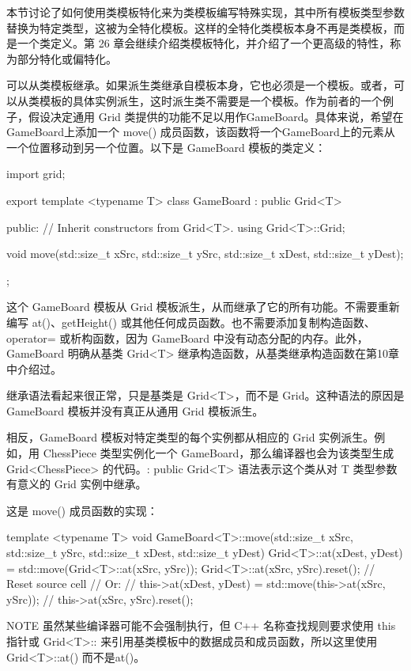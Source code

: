本节讨论了如何使用类模板特化来为类模板编写特殊实现，其中所有模板类型参数替换为特定类型，这被为全特化模板。这样的全特化类模板本身不再是类模板，而是一个类定义。第 26 章会继续介绍类模板特化，并介绍了一个更高级的特性，称为部分特化或偏特化。


可以从类模板继承。如果派生类继承自模板本身，它也必须是一个模板。或者，可以从类模板的具体实例派生，这时派生类不需要是一个模板。作为前者的一个例子，假设决定通用 Grid 类提供的功能不足以用作GameBoard。具体来说，希望在GameBoard上添加一个 move() 成员函数，该函数将一个GameBoard上的元素从一个位置移动到另一个位置。以下是 GameBoard 模板的类定义：

\begin{cpp}
import grid;

export template <typename T>
class GameBoard : public Grid<T>
{
    public:
        // Inherit constructors from Grid<T>.
        using Grid<T>::Grid;

        void move(std::size_t xSrc, std::size_t ySrc,
            std::size_t xDest, std::size_t yDest);
};
\end{cpp}

这个 GameBoard 模板从 Grid 模板派生，从而继承了它的所有功能。不需要重新编写 at()、getHeight() 或其他任何成员函数。也不需要添加复制构造函数、operator= 或析构函数，因为 GameBoard 中没有动态分配的内存。此外，GameBoard 明确从基类 Grid<T> 继承构造函数，从基类继承构造函数在第10章中介绍过。

继承语法看起来很正常，只是基类是 Grid<T>，而不是 Grid。这种语法的原因是 GameBoard 模板并没有真正从通用 Grid 模板派生。

相反，GameBoard 模板对特定类型的每个实例都从相应的 Grid 实例派生。例如，用 ChessPiece 类型实例化一个 GameBoard，那么编译器也会为该类型生成 Grid<ChessPiece> 的代码。: public Grid<T> 语法表示这个类从对 T 类型参数有意义的 Grid 实例中继承。

这是 move() 成员函数的实现：

\begin{cpp}
template <typename T>
void GameBoard<T>::move(std::size_t xSrc, std::size_t ySrc,
    std::size_t xDest, std::size_t yDest)
{
    Grid<T>::at(xDest, yDest) = std::move(Grid<T>::at(xSrc, ySrc));
    Grid<T>::at(xSrc, ySrc).reset(); // Reset source cell
    // Or:
    // this->at(xDest, yDest) = std::move(this->at(xSrc, ySrc));
    // this->at(xSrc, ySrc).reset();
}
\end{cpp}

\begin{myNotic}{NOTE}
虽然某些编译器可能不会强制执行，但 C++ 名称查找规则要求使用 this 指针或 Grid<T>:: 来引用基类模板中的数据成员和成员函数，所以这里使用 Grid<T>::at() 而不是at()。
\end{myNotic}

